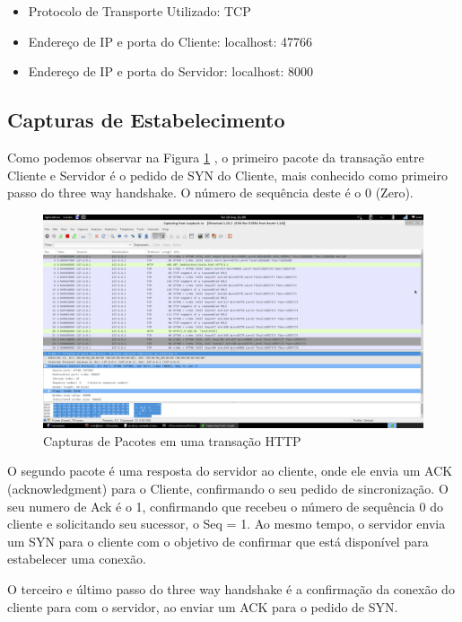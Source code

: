 \begin{itemize}

    \item Protocolo de Transporte Utilizado: TCP

    \item Endereço de IP e porta do Cliente: localhost: 47766

    \item Endereço de IP e porta do Servidor: localhost: 8000

\end{itemize}

\subsection{Capturas de Estabelecimento}
Como podemos observar na Figura \ref{fig:http} , o primeiro pacote da transação entre Cliente e Servidor é o
pedido de SYN do Cliente, mais conhecido como primeiro passo do three way handshake. O número de
  sequência deste é o 0 (Zero).

  \begin{figure}[h]
    \centering

    \includegraphics[width=450px, scale=1]{figuras/http}
    \caption{Capturas de Pacotes em uma transação HTTP}

 \label{fig:http}
  \end{figure}

O segundo pacote é uma resposta do servidor ao cliente, onde ele envia um ACK (acknowledgment)
para o Cliente, confirmando o seu pedido de sincronização. O seu numero de Ack é o 1, confirmando
que recebeu o número de sequência 0 do cliente e solicitando seu sucessor, o Seq = 1. Ao mesmo tempo,
  o servidor envia um SYN para o cliente com o objetivo de confirmar que está disponível para
  estabelecer uma conexão.

O terceiro e último passo do three way handshake é a confirmação da conexão do cliente para com o
servidor, ao enviar um ACK para o pedido de SYN.

